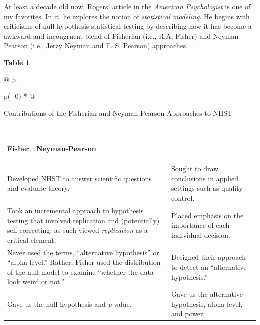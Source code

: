 \documentclass[
  11pt,
]{book}
\begin{document}
At least a decade old now, Rogers' \citeyearpar{rodgers_epistemology_2010} article in the \emph{American Psychologist} is one of my favorites. In it, he explores the notion of \emph{statistical modeling}. He begins with criticisms of null hypothesis statistical testing by describing how it has become a awkward and incongruent blend of Fisherian (i.e., R.A. Fisher) and Neyman-Pearson (i.e., Jerzy Neyman and E. S. Pearson) approaches.

\textbf{Table 1}

\begin{longtable}[]{@{}
  >{\raggedright\arraybackslash}p{(\columnwidth - 0\tabcolsep) * }@{}}
\toprule
\begin{minipage}[b]{\linewidth}\raggedright
Contributions of the Fisherian and Neyman-Pearson Approaches to NHST \citep{rodgers_epistemology_2010}
\end{minipage} \\
\midrule
\endhead
\bottomrule
\end{longtable}

\begin{longtable}[]{@{}
  >{\centering\arraybackslash}p{}
  >{\centering\arraybackslash}p{}@{}}
\toprule
\endhead
\textbf{Fisher} & \textbf{Neyman-Pearson} \\
\bottomrule
\end{longtable}

\begin{longtable}[]{@{}
  >{\raggedright\arraybackslash}p{}
  >{\raggedright\arraybackslash}p{}@{}}
\toprule
\endhead
Developed NHST to answer scientific questions and evaluate theory. & Sought to draw conclusions in applied settings such as quality control. \\
Took an incremental approach to hypothesis testing that involved replication and (potentially) self-correcting; as such viewed \emph{replication} as a critical element. & Placed emphasis on the importance of each individual decision. \\
Never used the terms, ``alternative hypothesis'' or ``alpha level.'' Rather, Fisher used the distribution of the null model to examine ``whether the data look weird or not.'' & Designed their approach to detect an ``alternative hypothesis.'' \\
Gave us the null hypothesis and \emph{p} value. & Gave us the alternative hypothesis, alpha level, and power. \\
\bottomrule
\end{longtable}
\end{document}
